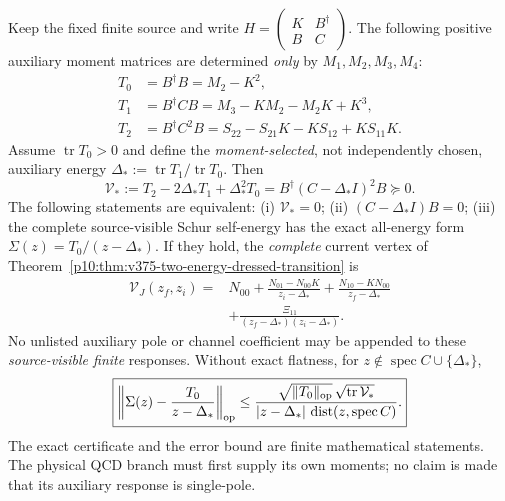 \documentclass[12pt,a4paper]{article}
\begin{document}
\begin{theorem}
\label{p10:thm:v377-four-moment-flatness}
Keep the fixed finite source and write
$H=\left(\begin{smallmatrix}K&B^\dagger\\ B&C\end{smallmatrix}\right)$.
The following positive auxiliary moment matrices are determined
\emph{only} by $M_1,M_2,M_3,M_4$:
\[
\begin{aligned}
T_0&=B^\dagger B=M_2-K^2,\\
T_1&=B^\dagger CB=M_3-KM_2-M_2K+K^3,\\
T_2&=B^\dagger C^2B
 =S_{22}-S_{21}K-KS_{12}+KS_{11}K.
\end{aligned}
\]
Assume $\operatorname{tr}T_0>0$ and define the \emph{moment-selected},
not independently chosen, auxiliary energy
$\Delta_*:=\operatorname{tr}T_1/\operatorname{tr}T_0$.
Then
\[
\boxed{\mathcal V_*:=T_2-2\Delta_*T_1+\Delta_*^2T_0
 =B^\dagger(C-\Delta_*I)^2B\succeq0.}
\]
The following statements are equivalent: (i) $\mathcal V_*=0$;
(ii) $(C-\Delta_*I)B=0$; (iii) the complete source-visible
Schur self-energy has the exact all-energy form
$\Sigma(z)=T_0/(z-\Delta_*)$.
If they hold, the \emph{complete} current vertex of
Theorem~\ref{p10:thm:v375-two-energy-dressed-transition} is
\[
\boxed{\begin{aligned}
\mathcal V_J(z_f,z_i)={}&N_{00}
 +\frac{N_{01}-N_{00}K}{z_i-\Delta_*}
 +\frac{N_{10}-KN_{00}}{z_f-\Delta_*}\\
 &+\frac{\Xi_{11}}{(z_f-\Delta_*)(z_i-\Delta_*)}.
\end{aligned}}
\]
No unlisted auxiliary pole or channel coefficient may be appended to
these \emph{source-visible finite} responses. Without exact flatness,
for $z\notin\operatorname{spec}C\cup\{\Delta_*\}$,
\[
\boxed{\left\|\Sigma(z)-\frac{T_0}{z-\Delta_*}\right\|_{\rm op}
\le\frac{\sqrt{\|T_0\|_{\rm op}}\,
\sqrt{\operatorname{tr}\mathcal V_*}}
{|z-\Delta_*|\,\operatorname{dist}(z,\operatorname{spec}C)}.}
\]
The exact certificate and the error bound are finite mathematical
statements. The physical QCD branch must first supply its own moments;
no claim is made that its auxiliary response is single-pole.
\end{theorem}
\end{document}
